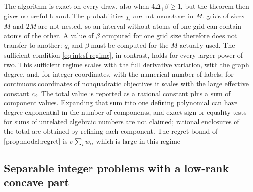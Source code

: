 The algorithm is exact on every draw, also when $4\Delta_+\beta\ge1$, but the
theorem then gives no useful bound. The probabilities $q_i$ are not monotone
in $M$: grids of sizes $M$ and $2M$ are not nested, so an interval without
atoms of one grid can contain atoms of the other. A value of $\beta$
computed for one grid size therefore does not transfer to another; $q_i$ and
$\beta$ must be computed for the $M$ actually used. The sufficient condition
\eqref{eq:int:sf-regime}, in contrast, holds for every larger power of two.
This sufficient regime scales with the full derivative
variation, with the graph degree, and, for integer coordinates, with the
numerical number of labels; for continuous coordinates of nonquadratic
objectives it scales with the large effective constant $c_d$. The total value
is reported as a rational constant plus a sum of component values. Expanding
that sum into one defining polynomial can have degree exponential in the
number of components, and exact sign or equality tests for sums of unrelated
algebraic numbers are not claimed; rational enclosures of the total are
obtained by refining each component. The regret bound of
\cref{prop:model:regret} is $\sigma\sum_iw_i$, which is large in this regime.

\subsection{Separable integer problems with a low-rank concave part}\label{sec:int:lowrank}

